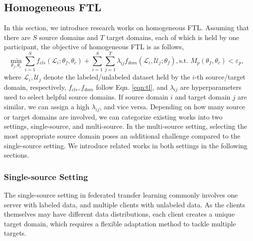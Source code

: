 \documentclass[11pt]{article}
\begin{document}
\subsection{Homogeneous FTL}
In this section, we introduce research works on homogeneous FTL. Assuming that there are $S$ source domains and $T$ target domains, each of which is held by one participant, the objective of homogeneous FTL is as follows,
\begin{equation}
\min_{\theta_f, \theta_c} \sum_{i=1}^Sf_{cls}(\mathcal{L}_i;\theta_f, \theta_c) + \sum_{i=1}^S\sum_{j=1}^T\lambda_{ij}f_{dom}(\mathcal{L}_i, \mathcal{U}_j;\theta_f), \text{s.t. } M_p(\theta_f, \theta_c) < \varepsilon_p, 
\end{equation}
where $\mathcal{L}_i, \mathcal{U}_j$ denote the labeled/unlabeled dataset held by the $i$-th source/target domain, respectively, $f_{cls}, f_{dom}$ follow Eqn. \ref{eqn:tl}, and $\lambda_{ij}$ are hyperparameters used to select helpful source domains. If source domain $i$ and target domain $j$ are similar, we can assign a high $\lambda_{ij}$, and vice versa. Depending on how many source or target domains are involved, we can categorize existing works into two settings, single-source, and multi-source. In the multi-source setting, selecting the most appropriate source domain poses an additional challenge compared to the single-source setting. We introduce related works in both settings in the following sections. 

\subsubsection{Single-source Setting}
The single-source setting in federated transfer learning commonly involves one server with labeled data, and multiple clients with unlabeled data. As the clients themselves may have different data distributions, each client creates a unique target domain, which requires a flexible adaptation method to tackle multiple targets.  
\end{document}
